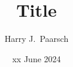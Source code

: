 \documentclass[notes,compress,serif,professionalfont]{beamer}
\begin{document}
\title{Title}
\author{Harry J.~Paarsch}
\date{xx June 2024}

\begin{frame}
  \titlepage
\end{frame}




\end{document}

